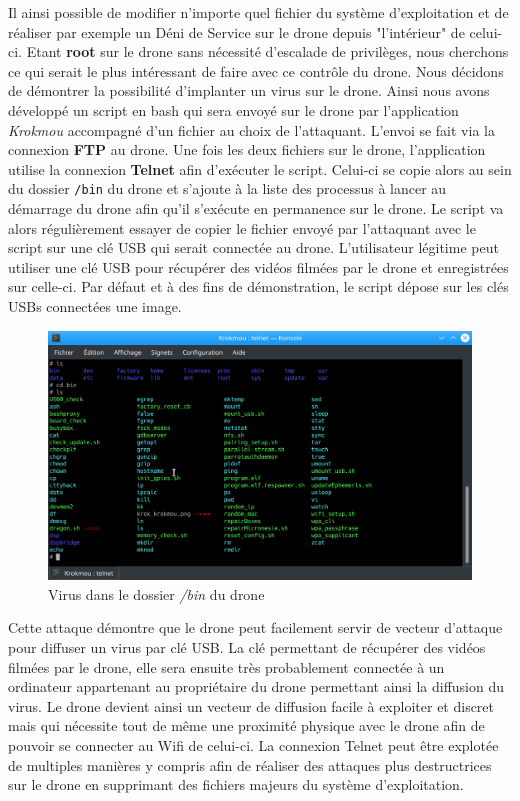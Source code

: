 Il ainsi possible de modifier n'importe quel fichier du système d'exploitation et de réaliser par exemple un Déni de Service sur le drone depuis "l'intérieur" de celui-ci. Etant \textbf{root} sur le drone sans nécessité d'escalade de privilèges, nous cherchons ce qui serait le plus intéressant de faire avec ce contrôle du drone. Nous décidons de démontrer la possibilité d'implanter un virus sur le drone. Ainsi nous avons développé un script en bash qui sera envoyé sur le drone par l'application \textit{Krokmou} accompagné d'un fichier au choix de l'attaquant. L'envoi se fait via la connexion \textbf{FTP} au drone. Une fois les deux fichiers sur le drone, l'application utilise la connexion \textbf{Telnet} afin d'exécuter le script. Celui-ci se copie alors au sein du dossier \verb!/bin! du drone et s'ajoute à la liste des processus à lancer au démarrage du drone afin qu'il s'exécute en permanence sur le drone. Le script va alors régulièrement essayer de copier le fichier envoyé par l'attaquant avec le script sur une clé USB qui serait connectée au drone. L'utilisateur légitime peut utiliser une clé USB pour récupérer des vidéos filmées par le drone et enregistrées sur celle-ci. Par défaut et à des fins de démonstration, le script dépose sur les clés USBs connectées une image.

\begin{figure}[H]
  \centering
  \includegraphics[scale=0.35]{images/bin_folder.png}
  \caption{Virus dans le dossier \textit{/bin} du drone}
\end{figure}

Cette attaque démontre que le drone peut facilement servir de vecteur d'attaque pour diffuser un virus par clé USB. La clé permettant de récupérer des vidéos filmées par le drone, elle sera ensuite très probablement connectée à un ordinateur appartenant au propriétaire du drone permettant ainsi la diffusion du virus. Le drone devient ainsi un vecteur de diffusion facile à exploiter et discret mais qui nécessite tout de même une proximité physique avec le drone afin de pouvoir se connecter au Wifi de celui-ci.
\newline La connexion Telnet peut être explotée de multiples manières y compris afin de réaliser des attaques plus destructrices sur le drone en supprimant des fichiers majeurs du système d'exploitation.

